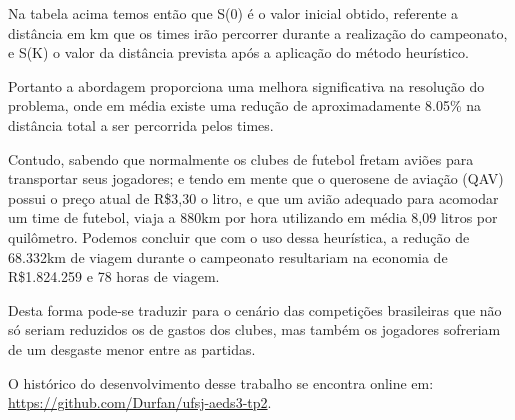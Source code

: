 \documentclass[12pt,a4paper]{article}
\begin{document}
Na tabela acima temos então que S(0) é o valor inicial obtido, referente a distância em km que os times irão percorrer durante a realização do campeonato, e S(K) o valor da distância prevista após a aplicação do método heurístico. 

Portanto a abordagem proporciona uma melhora significativa na resolução do problema, onde em média existe uma redução de aproximadamente 8.05\% na distância total a ser percorrida pelos times. 

Contudo, sabendo que normalmente os clubes de futebol fretam aviões para transportar seus jogadores; e tendo em mente que o querosene de aviação (QAV)\cite{ttp:qav} possui o preço atual de R\$3,30 o litro, e que um avião adequado para acomodar um time de futebol, viaja a 880km por hora utilizando em média 8,09 litros por quilômetro\cite{ttp:rendimento}. Podemos concluir que com o uso dessa heurística, a redução de 68.332km de viagem durante o campeonato resultariam na economia de R\$1.824.259 e 78 horas de viagem. 

Desta forma pode-se traduzir para o cenário das competições brasileiras que não só seriam reduzidos os de gastos dos clubes, mas também os jogadores sofreriam de um desgaste menor entre as partidas.

\pagebreak

\begin{flushleft}
	\nocite{*}
	
	\vfill
	O histórico do desenvolvimento desse trabalho se encontra online em:\\ \url{https://github.com/Durfan/ufsj-aeds3-tp2}.
\end{flushleft}
\end{document}
